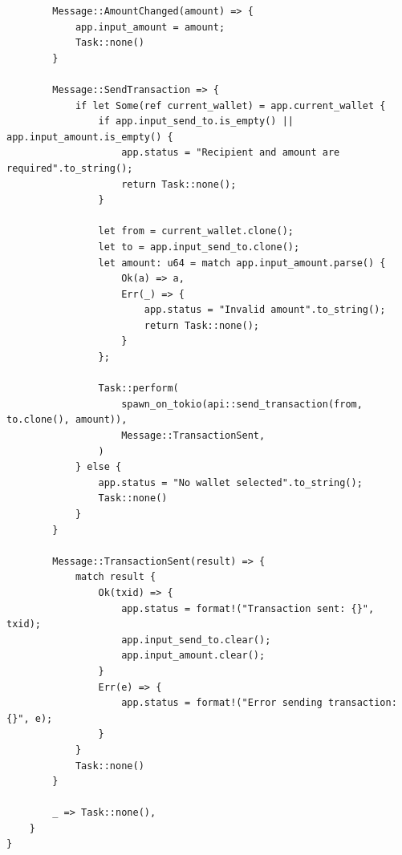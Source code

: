 \begin{listing}[H]
\begin{verbatim}
        Message::AmountChanged(amount) => {
            app.input_amount = amount;
            Task::none()
        }

        Message::SendTransaction => {
            if let Some(ref current_wallet) = app.current_wallet {
                if app.input_send_to.is_empty() || app.input_amount.is_empty() {
                    app.status = "Recipient and amount are required".to_string();
                    return Task::none();
                }

                let from = current_wallet.clone();
                let to = app.input_send_to.clone();
                let amount: u64 = match app.input_amount.parse() {
                    Ok(a) => a,
                    Err(_) => {
                        app.status = "Invalid amount".to_string();
                        return Task::none();
                    }
                };

                Task::perform(
                    spawn_on_tokio(api::send_transaction(from, to.clone(), amount)),
                    Message::TransactionSent,
                )
            } else {
                app.status = "No wallet selected".to_string();
                Task::none()
            }
        }

        Message::TransactionSent(result) => {
            match result {
                Ok(txid) => {
                    app.status = format!("Transaction sent: {}", txid);
                    app.input_send_to.clear();
                    app.input_amount.clear();
                }
                Err(e) => {
                    app.status = format!("Error sending transaction: {}", e);
                }
            }
            Task::none()
        }

        _ => Task::none(),
    }
}
\end{verbatim}
\end{listing}
